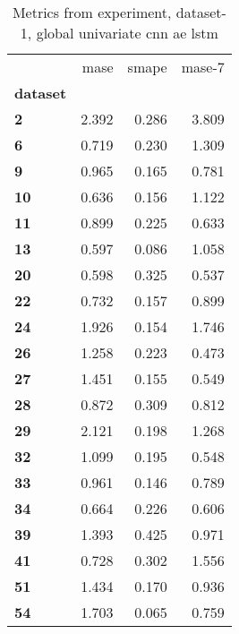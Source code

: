 \begin{table}[h]
\centering
\caption{Metrics from experiment, dataset-1, global univariate cnn ae lstm}
\label{table:global-univariate-cnn-ae-lstm-dataset-1}
\begin{tabular}{lrrr}
\toprule
{} &   mase &  smape &  mase-7 \\
\textbf{dataset} &        &        &         \\
\midrule
\textbf{2      } &  2.392 &  0.286 &   3.809 \\
\textbf{6      } &  0.719 &  0.230 &   1.309 \\
\textbf{9      } &  0.965 &  0.165 &   0.781 \\
\textbf{10     } &  0.636 &  0.156 &   1.122 \\
\textbf{11     } &  0.899 &  0.225 &   0.633 \\
\textbf{13     } &  0.597 &  0.086 &   1.058 \\
\textbf{20     } &  0.598 &  0.325 &   0.537 \\
\textbf{22     } &  0.732 &  0.157 &   0.899 \\
\textbf{24     } &  1.926 &  0.154 &   1.746 \\
\textbf{26     } &  1.258 &  0.223 &   0.473 \\
\textbf{27     } &  1.451 &  0.155 &   0.549 \\
\textbf{28     } &  0.872 &  0.309 &   0.812 \\
\textbf{29     } &  2.121 &  0.198 &   1.268 \\
\textbf{32     } &  1.099 &  0.195 &   0.548 \\
\textbf{33     } &  0.961 &  0.146 &   0.789 \\
\textbf{34     } &  0.664 &  0.226 &   0.606 \\
\textbf{39     } &  1.393 &  0.425 &   0.971 \\
\textbf{41     } &  0.728 &  0.302 &   1.556 \\
\textbf{51     } &  1.434 &  0.170 &   0.936 \\
\textbf{54     } &  1.703 &  0.065 &   0.759 \\
\bottomrule
\end{tabular}
\end{table}
